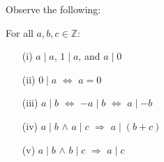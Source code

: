 \newpage

\noindent
Observe the following:

\begin{theo}

    \label{theo:properties_of_divisibility}

    For all $a, b, c \in \mathbb{Z}$:

    \begin{itemize}
        \item[(i)] $a \mid a$, $1 \mid a$, and $a \mid 0$
        \item[(ii)] $0 \mid a$ $\Longleftrightarrow$ $a = 0$
        \item[(iii)] $a \mid b$ $\Longleftrightarrow$ $-a \mid b$ $\Longleftrightarrow$ $a \mid -b$
        \item[(iv)] $a \mid b$ $\land$ $a \mid c$ $\Longrightarrow$ $a \mid (b + c)$
        \item[(v)] $a \mid b$ $\land$ $b \mid c$ $\Longrightarrow$ $a \mid c$
    \end{itemize}
\end{theo}


